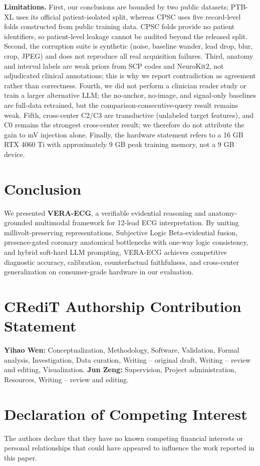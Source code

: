 \documentclass[preprint,12pt]{elsarticle}
\begin{document}
\textbf{Limitations.} First, our conclusions are bounded by two public datasets; PTB-XL uses its official patient-isolated split, whereas CPSC uses five record-level folds constructed from public training data. CPSC folds provide no patient identifiers, so patient-level leakage cannot be audited beyond the released split. Second, the corruption suite is synthetic (noise, baseline wander, lead drop, blur, crop, JPEG) and does not reproduce all real acquisition failures. Third, anatomy and interval labels are weak priors from SCP codes and NeuroKit2, not adjudicated clinical annotations; this is why we report contradiction as agreement rather than correctness. Fourth, we did not perform a clinician reader study or train a larger alternative LLM; the no-anchor, no-image, and signal-only baselines are full-data retrained, but the comparison-consecutive-query result remains weak. Fifth, cross-center C2/C3 are transductive (unlabeled target features), and C0 remains the strongest cross-center result; we therefore do not attribute the gain to mV injection alone. Finally, the hardware statement refers to a 16 GB RTX 4060 Ti with approximately 9 GB peak training memory, not a 9 GB device.

\section{Conclusion}
We presented \textbf{VERA-ECG}, a verifiable evidential reasoning and anatomy-grounded multimodal framework for 12-lead ECG interpretation. By uniting millivolt-preserving representations, Subjective Logic Beta-evidential fusion, presence-gated coronary anatomical bottlenecks with one-way logic consistency, and hybrid soft-hard LLM prompting, VERA-ECG achieves competitive diagnostic accuracy, calibration, counterfactual faithfulness, and cross-center generalization on consumer-grade hardware in our evaluation.



\section*{CRediT Authorship Contribution Statement}
\textbf{Yihao Wen:} Conceptualization, Methodology, Software, Validation, Formal analysis, Investigation, Data curation, Writing -- original draft, Writing -- review and editing, Visualization.
\textbf{Jun Zeng:} Supervision, Project administration, Resources, Writing -- review and editing.

\section*{Declaration of Competing Interest}
The authors declare that they have no known competing financial interests or personal relationships that could have appeared to influence the work reported in this paper.
\end{document}
